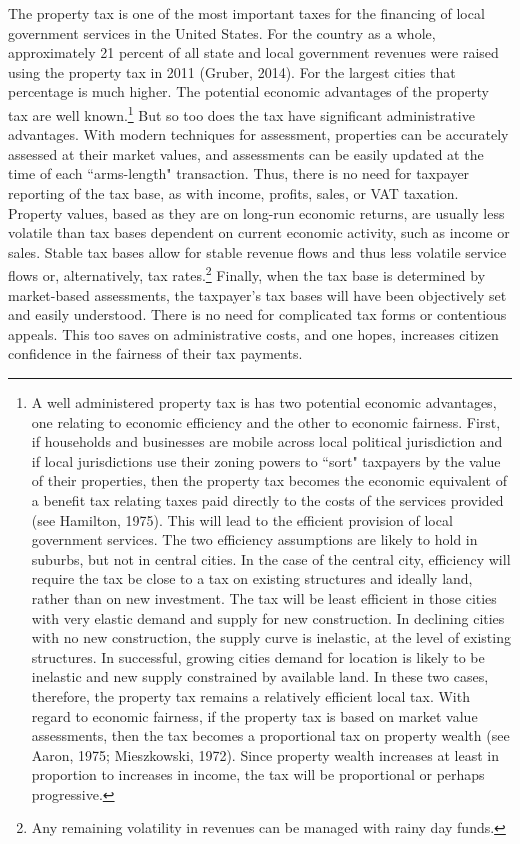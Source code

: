 \documentclass[12pt,titlepage]{article}
\begin{document}
The property tax is one of the most important taxes for the financing
of local government services in the United States.  For the country as
a whole, approximately 21 percent of all state and local government
revenues were raised using the property tax in 2011 (Gruber, 2014).
For the largest cities that percentage is much higher.  The potential
economic advantages of the property tax are well known.\footnote{A
  well administered property tax is has two potential economic
  advantages, one relating to economic efficiency and the other to
  economic fairness.  First, if households and businesses are mobile
  across local political jurisdiction and if local jurisdictions use
  their zoning powers to ``sort" taxpayers by the value of their
  properties, then the property tax becomes the economic equivalent of
  a benefit tax relating taxes paid directly to the costs of the
  services provided (see Hamilton, 1975).  This will lead to the
  efficient provision of local government services.  The two
  efficiency assumptions are likely to hold in suburbs, but not in
  central cities.  In the case of the central city, efficiency will
  require the tax be close to a tax on existing structures and ideally
  land, rather than on new investment.  The tax will be least
  efficient in those cities with very elastic demand and supply for
  new construction.  In declining cities with no new construction, the
  supply curve is inelastic, at the level of existing structures.  In
  successful, growing cities demand for location is likely to be
  inelastic and new supply constrained by available land.  In these
  two cases, therefore, the property tax remains a relatively
  efficient local tax.  With regard to economic fairness, if the
  property tax is based on market value assessments, then the tax
  becomes a proportional tax on property wealth (see Aaron, 1975;
  Mieszkowski, 1972).  Since property wealth increases at least in
  proportion to increases in income, the tax will be proportional or
  perhaps progressive.}  But so too does the tax have significant
administrative advantages.  With modern techniques for assessment,
properties can be accurately assessed at their market values, and
assessments can be easily updated at the time of each ``arms-length"
transaction.  Thus, there is no need for taxpayer reporting of the tax
base, as with income, profits, sales, or VAT taxation.  Property
values, based as they are on long-run economic returns, are usually
less volatile than tax bases dependent on current economic activity,
such as income or sales. Stable tax bases allow for stable revenue
flows and thus less volatile service flows or, alternatively, tax
rates.\footnote{Any remaining volatility in revenues can be managed
  with rainy day funds.} Finally, when the tax base is determined by
market-based assessments, the taxpayer's tax bases will have been
objectively set and easily understood.  There is no need for
complicated tax forms or contentious appeals.  This too saves on
administrative costs, and one hopes, increases citizen confidence in
the fairness of their tax payments.
\end{document}
